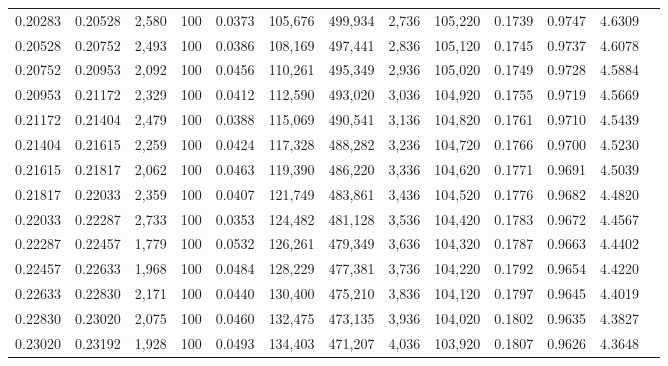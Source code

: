 \begin{tabular}{rrrrrrrrrrrrr}
0.20283 & 0.20528 & 2,580 & 100 &                                     0.0373 & 105,676 & 499,934 &   2,736 & 105,220 & 0.1739 & 0.9747 & 4.6309 \\
0.20528 & 0.20752 & 2,493 & 100 &                                     0.0386 & 108,169 & 497,441 &   2,836 & 105,120 & 0.1745 & 0.9737 & 4.6078 \\
0.20752 & 0.20953 & 2,092 & 100 &                                     0.0456 & 110,261 & 495,349 &   2,936 & 105,020 & 0.1749 & 0.9728 & 4.5884 \\
0.20953 & 0.21172 & 2,329 & 100 &                                     0.0412 & 112,590 & 493,020 &   3,036 & 104,920 & 0.1755 & 0.9719 & 4.5669 \\
0.21172 & 0.21404 & 2,479 & 100 &                                     0.0388 & 115,069 & 490,541 &   3,136 & 104,820 & 0.1761 & 0.9710 & 4.5439 \\
0.21404 & 0.21615 & 2,259 & 100 &                                     0.0424 & 117,328 & 488,282 &   3,236 & 104,720 & 0.1766 & 0.9700 & 4.5230 \\
0.21615 & 0.21817 & 2,062 & 100 &                                     0.0463 & 119,390 & 486,220 &   3,336 & 104,620 & 0.1771 & 0.9691 & 4.5039 \\
0.21817 & 0.22033 & 2,359 & 100 &                                     0.0407 & 121,749 & 483,861 &   3,436 & 104,520 & 0.1776 & 0.9682 & 4.4820 \\
0.22033 & 0.22287 & 2,733 & 100 &                                     0.0353 & 124,482 & 481,128 &   3,536 & 104,420 & 0.1783 & 0.9672 & 4.4567 \\
0.22287 & 0.22457 & 1,779 & 100 &                                     0.0532 & 126,261 & 479,349 &   3,636 & 104,320 & 0.1787 & 0.9663 & 4.4402 \\
0.22457 & 0.22633 & 1,968 & 100 &                                     0.0484 & 128,229 & 477,381 &   3,736 & 104,220 & 0.1792 & 0.9654 & 4.4220 \\
0.22633 & 0.22830 & 2,171 & 100 &                                     0.0440 & 130,400 & 475,210 &   3,836 & 104,120 & 0.1797 & 0.9645 & 4.4019 \\
0.22830 & 0.23020 & 2,075 & 100 &                                     0.0460 & 132,475 & 473,135 &   3,936 & 104,020 & 0.1802 & 0.9635 & 4.3827 \\
0.23020 & 0.23192 & 1,928 & 100 &                                     0.0493 & 134,403 & 471,207 &   4,036 & 103,920 & 0.1807 & 0.9626 & 4.3648 \\

\end{tabular}
